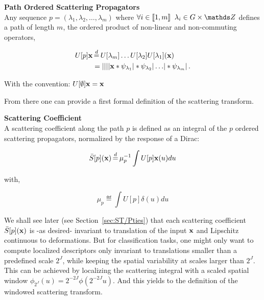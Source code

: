 \documentclass[a4paper,11pt]{report}
\begin{document}
			\begin{defn} \textbf{Path Ordered Scattering Propagators}\\ 
				Any sequence $p = (\lambda_{1}, \lambda_{2},\dots ,\lambda_{m})$ where $\forall i \in \llbracket 1,m \rrbracket \;\; \lambda_{i} \in G \times \dsZ$ defines a path of length $m$, \ie the ordered product of non-linear and non-commuting operators,
				
				\begin{equation}
					\label{eq:path ordered SP}
					\begin{split}
						U[p]\bfx &\eqdef U[\lambda_{m}]\dots U[\lambda_{2}]U[\lambda_{1}](\bfx) \\
							&= \abs{\abs{\abs{\abs{\bfx \ast \psi_{\lambda_{1}}} \ast \psi_{\lambda_{2}}} 
							\dots } \ast \psi_{\lambda_{m}}}.   
					\end{split}
				\end{equation}
				
				With the convention: $U[\emptyset]{\bf x} = {\bf x}$\\
				\label{def:path ordered SO}
      \end{defn} 
      
      From there one can provide a first formal definition of the scattering transform.
      
      \begin{defn} \textbf{Scattering Coefficient}\\
				A scattering coefficient along the path $p$ is defined as an integral of the $p$ ordered scattering propagators, normalized by the response of a Dirac:

				\begin{equation}
					\label{eq:ST1}
					\bar{S}[p](\bfx) \eqdef \mu_{p}^{-1} \int U[p]\bfx(u) du
				\end{equation}
				
				with,
				
				\begin{equation*}
					\label{eq:ST normalization}
					\mu_{p} \eqdef \int U[p]\delta(u)du      
				\end{equation*}
				\label{def:SC}
      \end{defn}
      
      We shall see later (see Section~\ref{sec:ST/Pties}) that each scattering coefficient $\bar{S}[p]({\bf x})$ is -as desired- invariant to translation of the input ${\bf x}$ and Lipschitz continuous to deformations. But for classification tasks, one might only want to compute localized descriptors only invariant to translations smaller than a predefined scale $2^{J}$, while keeping the spatial variability at 
      scales larger than $2^{J}$. This can be achieved by localizing the scattering integral with a scaled spatial window $\phi_{2^{J}}(u) = 2^{-2J} \phi(2^{-2J}u)$. And this yields to the definition of the windowed scattering transform.
      
\end{document}
